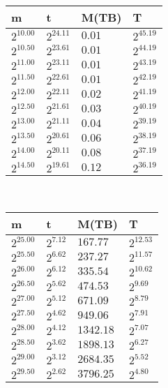 \begin{tabular}{llll}
m & t & M(TB) & T \\ \hline
$2^{10.00}$ & $2^{24.11}$ & $0.01$ & $2^{45.19}$ \\
$2^{10.50}$ & $2^{23.61}$ & $0.01$ & $2^{44.19}$ \\
$2^{11.00}$ & $2^{23.11}$ & $0.01$ & $2^{43.19}$ \\
$2^{11.50}$ & $2^{22.61}$ & $0.01$ & $2^{42.19}$ \\
$2^{12.00}$ & $2^{22.11}$ & $0.02$ & $2^{41.19}$ \\
$2^{12.50}$ & $2^{21.61}$ & $0.03$ & $2^{40.19}$ \\
$2^{13.00}$ & $2^{21.11}$ & $0.04$ & $2^{39.19}$ \\
$2^{13.50}$ & $2^{20.61}$ & $0.06$ & $2^{38.19}$ \\
$2^{14.00}$ & $2^{20.11}$ & $0.08$ & $2^{37.19}$ \\
$2^{14.50}$ & $2^{19.61}$ & $0.12$ & $2^{36.19}$ \\
\end{tabular}
 \ 
\begin{tabular}{llll}
m & t & M(TB) & T \\ \hline
$2^{25.00}$ & $2^{7.12}$ & $167.77$ & $2^{12.53}$ \\
$2^{25.50}$ & $2^{6.62}$ & $237.27$ & $2^{11.57}$ \\
$2^{26.00}$ & $2^{6.12}$ & $335.54$ & $2^{10.62}$ \\
$2^{26.50}$ & $2^{5.62}$ & $474.53$ & $2^{9.69}$ \\
$2^{27.00}$ & $2^{5.12}$ & $671.09$ & $2^{8.79}$ \\
$2^{27.50}$ & $2^{4.62}$ & $949.06$ & $2^{7.91}$ \\
$2^{28.00}$ & $2^{4.12}$ & $1342.18$ & $2^{7.07}$ \\
$2^{28.50}$ & $2^{3.62}$ & $1898.13$ & $2^{6.27}$ \\
$2^{29.00}$ & $2^{3.12}$ & $2684.35$ & $2^{5.52}$ \\
$2^{29.50}$ & $2^{2.62}$ & $3796.25$ & $2^{4.80}$ \\
\end{tabular}
 \ 
